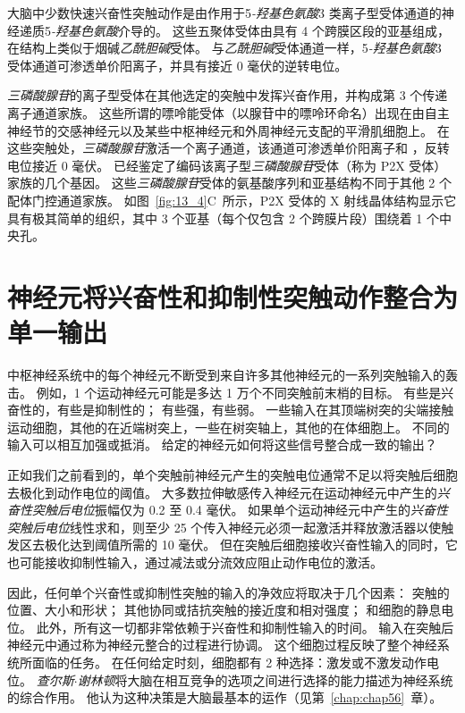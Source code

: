 大脑中少数快速兴奋性突触动作是由作用于5\textit{-羟基色氨酸}3 类离子型受体通道的神经递质5\textit{-羟基色氨酸}介导的。
这些五聚体受体由具有 4 个跨膜区段的亚基组成，在结构上类似于烟碱\textit{乙酰胆碱}受体。
与\textit{乙酰胆碱}受体通道一样，5\textit{-羟基色氨酸}3 受体通道可渗透单价阳离子，并具有接近 0 毫伏的逆转电位。


\textit{三磷酸腺苷}的离子型受体在其他选定的突触中发挥兴奋作用，并构成第 3 个传递离子通道家族。
这些所谓的嘌呤能受体（以腺苷中的嘌呤环命名）出现在由自主神经节的交感神经元以及某些中枢神经元和外周神经元支配的平滑肌细胞上。
在这些突触处，\textit{三磷酸腺苷}激活一个离子通道，该通道可渗透单价阳离子和 ，反转电位接近 0 毫伏。
已经鉴定了编码该离子型\textit{三磷酸腺苷}受体（称为 P2X 受体）家族的几个基因。
这些\textit{三磷酸腺苷}受体的氨基酸序列和亚基结构不同于其他 2 个配体门控通道家族。
如图~\ref{fig:13_4}C~所示，P2X 受体的 X 射线晶体结构显示它具有极其简单的组织，其中 3 个亚基（每个仅包含 2 个跨膜片段）围绕着 1 个中央孔。



\section{神经元将兴奋性和抑制性突触动作整合为单一输出}

中枢神经系统中的每个神经元不断受到来自许多其他神经元的一系列突触输入的轰击。
例如，1 个运动神经元可能是多达 1 万个不同突触前末梢的目标。
有些是兴奋性的，有些是抑制性的；
有些强，有些弱。
一些输入在其顶端树突的尖端接触运动细胞，其他的在近端树突上，一些在树突轴上，其他的在体细胞上。
不同的输入可以相互加强或抵消。
给定的神经元如何将这些信号整合成一致的输出？


正如我们之前看到的，单个突触前神经元产生的突触电位通常不足以将突触后细胞去极化到动作电位的阈值。
大多数拉伸敏感传入神经元在运动神经元中产生的\textit{兴奋性突触后电位}振幅仅为 0.2 至 0.4 毫伏。
如果单个运动神经元中产生的\textit{兴奋性突触后电位}线性求和，则至少 25 个传入神经元必须一起激活并释放激活器以使触发区去极化达到阈值所需的 10 毫伏。
但在突触后细胞接收兴奋性输入的同时，它也可能接收抑制性输入，通过减法或分流效应阻止动作电位的激活。


因此，任何单个兴奋性或抑制性突触的输入的净效应将取决于几个因素：
突触的位置、大小和形状；
其他协同或拮抗突触的接近度和相对强度；
和细胞的静息电位。 
此外，所有这一切都非常依赖于兴奋性和抑制性输入的时间。
输入在突触后神经元中通过称为神经元整合的过程进行协调。
这个细胞过程反映了整个神经系统所面临的任务。
在任何给定时刻，细胞都有 2 种选择：激发或不激发动作电位。
\textit{查尔斯$\cdot$谢林顿}将大脑在相互竞争的选项之间进行选择的能力描述为神经系统的综合作用。
他认为这种决策是大脑最基本的运作（见第~\ref{chap:chap56}~章）。



